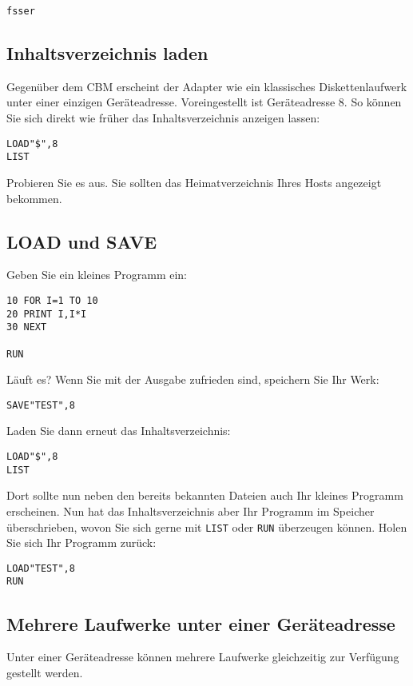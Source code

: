 \documentclass[10pt,a4paper]{scrartcl}		%
\begin{document}
\begin{verbatim}
fsser
\end{verbatim}


\subsection{Inhaltsverzeichnis laden}
Gegenüber dem CBM erscheint der Adapter wie ein klassisches Diskettenlaufwerk
unter einer einzigen Geräteadresse. Voreingestellt ist Geräteadresse 8.
So können Sie sich direkt wie früher das Inhaltsverzeichnis anzeigen
lassen:

\begin{verbatim}
LOAD"$",8
LIST
\end{verbatim}

Probieren Sie es aus. Sie sollten das Heimatverzeichnis Ihres Hosts
angezeigt bekommen.

\subsection{LOAD und SAVE}
Geben Sie ein kleines Programm ein:

\lstset{language=,} %
\begin{lstlisting}
10 FOR I=1 TO 10
20 PRINT I,I*I
30 NEXT

RUN
\end{lstlisting}

Läuft es? Wenn Sie mit der Ausgabe zufrieden sind, speichern Sie Ihr Werk:

\texttt{SAVE"TEST",8}

Laden Sie dann erneut das Inhaltsverzeichnis:

\begin{verbatim}
LOAD"$",8
LIST
\end{verbatim}

Dort sollte nun neben den bereits bekannten Dateien auch Ihr
kleines Programm erscheinen. Nun hat das Inhaltsverzeichnis 
aber Ihr Programm im Speicher überschrieben, wovon Sie sich
gerne mit \texttt{LIST} oder \texttt{RUN} überzeugen können.
Holen Sie sich Ihr Programm zurück:

\begin{verbatim}
LOAD"TEST",8
RUN
\end{verbatim}


\subsection{Mehrere Laufwerke unter einer Geräteadresse}
Unter einer Geräteadresse können mehrere Laufwerke gleichzeitig zur
Verfügung gestellt werden. 
\end{document}
